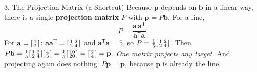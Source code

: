 \documentclass[10pt]{article}
\newcommand{\bb}{\mathbf{b}}
\newcommand{\pp}{\mathbf{p}}
\newcommand{\avec}{\mathbf{a}}
\newcommand{\T}{\mathsf{T}}
\begin{document}
\begin{notesbox}{3. The Projection Matrix (a Shortcut)}
Because $\pp$ depends on $\bb$ in a linear way, there is a single \textbf{projection matrix} $P$ with
$\pp=P\bb$. For a line,
\[
  P=\frac{\avec\,\avec^{\T}}{\avec^{\T}\avec}.
\]
For $\avec=\begin{bsmallmatrix} 1\\2 \end{bsmallmatrix}$: $\avec\avec^{\T}=\begin{bsmallmatrix} 1 & 2\\ 2 & 4 \end{bsmallmatrix}$ and $\avec^{\T}\avec=5$, so
$P=\frac{1}{5}\begin{bsmallmatrix} 1 & 2\\ 2 & 4 \end{bsmallmatrix}$. Then
$P\bb=\frac{1}{5}\begin{bsmallmatrix} 1 & 2\\ 2 & 4 \end{bsmallmatrix}\begin{bsmallmatrix} 4\\3 \end{bsmallmatrix}=\frac{1}{5}\begin{bsmallmatrix} 10\\20 \end{bsmallmatrix}=\begin{bsmallmatrix} 2\\4 \end{bsmallmatrix}=\pp.$
\emph{One matrix projects any target.} And projecting again does nothing: $P\pp=\pp$, because $\pp$ is
already \blank{2.6cm} the line.
\end{notesbox}
\end{document}
